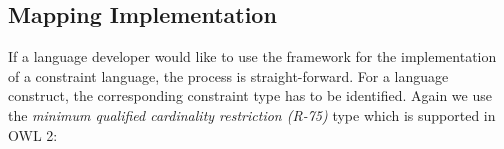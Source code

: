 \documentclass[a4paper,fontsize=11pt]{scrartcl}
\newenvironment{DL}{
  \vspace{0cm}
	\begin{center}
  \begin{tabular}{r l}

}{
  \end{tabular}
	\end{center}
}
\begin{document}

%
%
%



\subsection{Mapping Implementation}

If a language developer would like to use the framework for the implementation of a constraint language, the process is straight-forward. For a language construct, the corresponding constraint type has to be identified. Again we use the \emph{minimum qualified cardinality restriction (R-75)} type which is supported in OWL 2:
\end{document}
